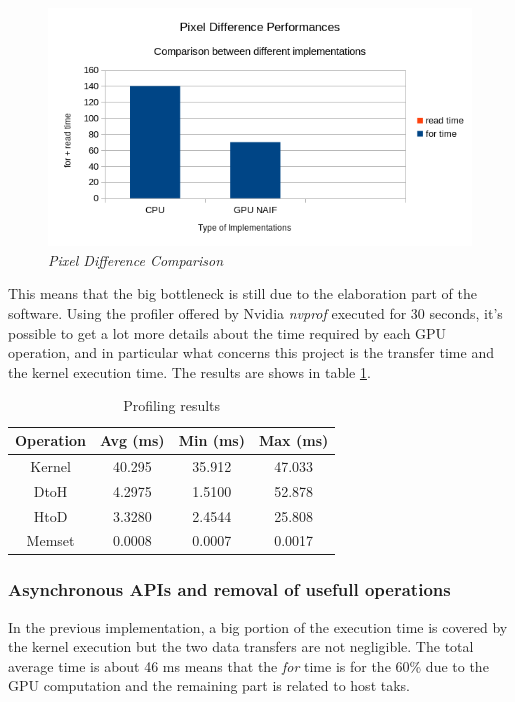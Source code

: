 \documentclass[paper=a4, fontsize=10pt]{scrartcl}	%
\begin{document}
	\begin{figure}[H]
		\centering
		\includegraphics[width=0.8\linewidth]{images/chart2.png}
		\caption{\textit{Pixel Difference Comparison}}
		\label{fig:chart2}
	\end{figure}

	This means that the big bottleneck is still due to the elaboration part of the software. Using the profiler offered by Nvidia \textit{nvprof} executed for 30 seconds, it's possible to get a lot more details about the time required by each GPU operation, and in particular what concerns this project is the transfer time and the kernel execution time. The results are shows in table \ref{tab:nvprof_naif}.

	\begin{table}[H]
		\centering
		\begin{tabular}{||c | c c c||} 
			\hline
			Operation & Avg (ms) & Min (ms) & Max (ms) \\ [0.5ex] 
			\hline\hline
			Kernel & 40.295 & 35.912 & 47.033 \\ 
			\hdashline
			DtoH & 4.2975 & 1.5100 & 52.878 \\
			\hdashline
			HtoD & 3.3280 & 2.4544 & 25.808 \\
			\hdashline
			Memset & 0.0008 & 0.0007 & 0.0017 \\
			\hline
		\end{tabular}
		\caption{Profiling results}
		\label{tab:nvprof_naif}
	\end{table}

	\subsubsection{Asynchronous APIs and removal of usefull operations}

	In the previous implementation, a big portion of the execution time is covered by the kernel execution but the two data transfers are not negligible. The total average time is about 46 ms means that the \textit{for} time is for the 60\% due to the GPU computation and the remaining part is related to host taks.\\
\end{document}
